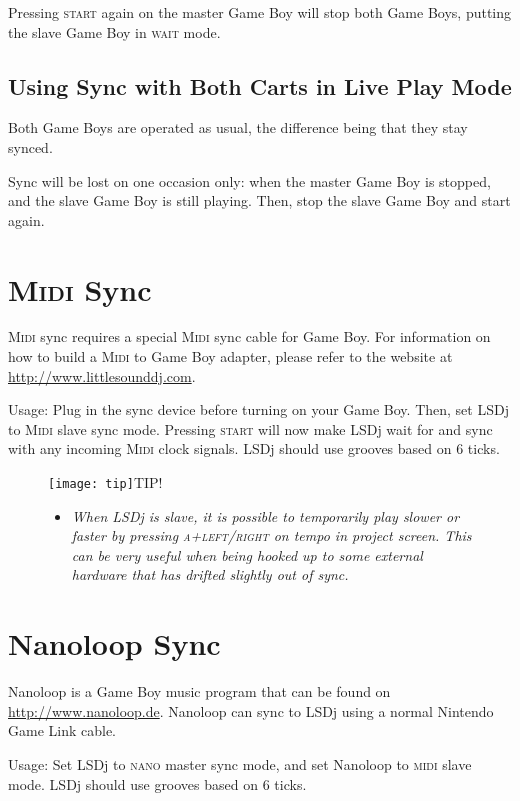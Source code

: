 Pressing \textsc{start} again on the master Game Boy will stop both Game Boys, putting the slave Game Boy in \textsc{wait} mode.

\subsection{Using Sync with Both Carts in Live Play Mode}

Both Game Boys are operated as usual, the difference being that they stay synced.

Sync will be lost on one occasion only: when the master Game Boy is stopped, and the slave Game Boy is still playing. Then, stop the slave Game Boy and start again.

\section{\textsc{Midi} Sync}

\textsc{Midi} sync requires a special \textsc{Midi} sync cable for Game Boy. For information on how to build a \textsc{Midi} to Game Boy adapter, please refer to the website at \url{http://www.littlesounddj.com}.

Usage: Plug in the sync device before turning on your Game Boy. Then, set LSDj to \textsc{Midi} slave sync mode. Pressing \textsc{start} will now make LSDj wait for and sync with any incoming \textsc{Midi} clock signals. LSDj should use grooves based on 6 ticks.

\begin{figure}[hbtp]
\texttt{[image: tip]}TIP!
\begin{itemize}
        \item \textit{When LSDj is slave, it is possible to temporarily play
slower or faster by pressing \textsc{a+left/right} on tempo in project screen. This can
be very useful when being hooked up to some external hardware that has drifted slightly out
of sync.}
	\end{itemize}
\end{figure}

\section{Nanoloop Sync}

Nanoloop is a Game Boy music program that can be found on \url{http://www.nanoloop.de}. Nanoloop can sync to LSDj using a normal Nintendo Game Link cable.

Usage: Set LSDj to \textsc{nano} master sync mode, and set Nanoloop to \textsc{midi} slave mode. LSDj should use grooves based on 6 ticks.

